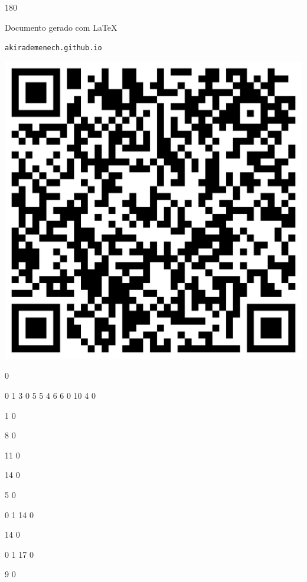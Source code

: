 \documentclass[12pt]{article}
\begin{document}
	\begin{turn}{180}	
		\begin{minipage}{\textwidth}		  
		  Documento gerado com \LaTeX			
		  
		  \texttt{akirademenech.github.io}

		  \includegraphics[height=0.3\textheight]{2e-2.pdf}

		\end{minipage}	
	\end{turn}  
		  
		\vfill  
		  
{
	0	%

	0	%
	1	%
	3	%
	0	%
	5	%
	5	%
	4	%
	6	%
	6	%
	0	%
	10	%
	4	%
	0	%

	1	%
	0	%

	8	%
	0	%

	11	%
	0	%

	14	%
	0	%

	5	%
	0	%

	0	%
	1	%
	14	%
	0	%

	14	%
	0	%

	0	%
	1	%
	17	%
	0	%

	9	%
	0	%
}	  
		    	
\end{document}
